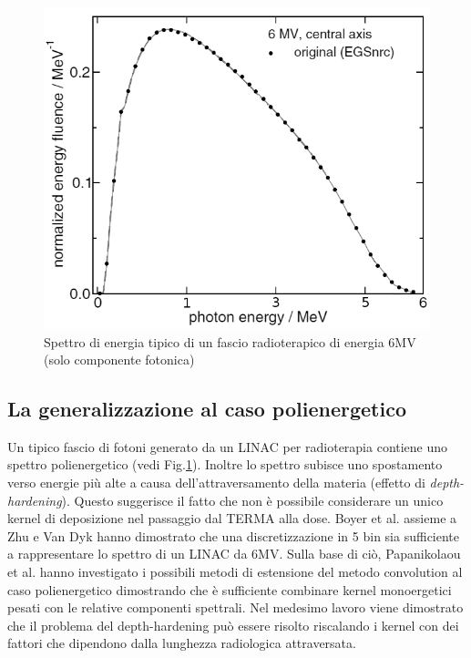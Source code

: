 {\begin{figure}
\centering
\includegraphics[width=.7\textwidth]{./cap1/LinacSpectrum.png}
\caption{Spettro di energia tipico di un fascio radioterapico di energia 6MV (solo componente fotonica)}
\label{fig:LinacSpectrum}
\end{figure}

\subsection{La generalizzazione al caso polienergetico}
Un tipico fascio di fotoni generato da un LINAC per radioterapia contiene uno spettro polienergetico (vedi Fig.\ref{fig:LinacSpectrum}). Inoltre lo spettro subisce uno spostamento verso energie più alte a causa dell'attraversamento della materia (effetto di \textit{depth-hardening}). Questo suggerisce il fatto che non è possibile considerare un unico kernel di deposizione nel passaggio dal TERMA alla dose. Boyer et al. assieme a Zhu e Van Dyk \cite{Boyer1989,Zhu1995} hanno dimostrato che una discretizzazione in 5 bin sia sufficiente a rappresentare lo spettro di un LINAC da 6MV. Sulla base di ciò, Papanikolaou et al. \cite{Papanikolaou1993} hanno investigato i possibili metodi di estensione del metodo convolution al caso polienergetico dimostrando che è sufficiente combinare kernel monoergetici pesati con le relative componenti spettrali. Nel medesimo lavoro viene dimostrato che il problema del depth-hardening può essere risolto riscalando i kernel con dei fattori che dipendono dalla lunghezza radiologica attraversata.

}
